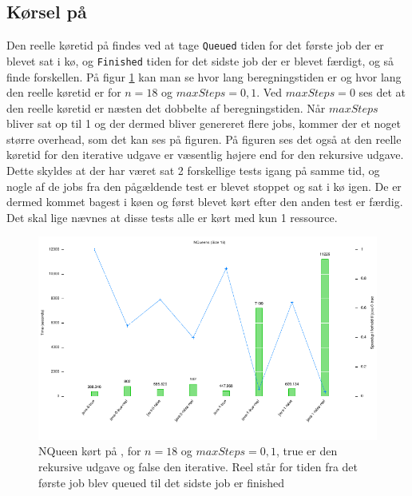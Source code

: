 \subsection{Kørsel på \mig}

Den reelle køretid på \mig findes ved at tage \texttt{Queued} tiden for det første job der er
blevet sat i kø, og \texttt{Finished} tiden for det sidste job der er blevet
færdigt, og så finde forskellen.
På figur \ref{figur:mig} kan man se hvor lang beregningstiden er og hvor lang
den reelle køretid er for $n=18$ og $maxSteps=0,1$. Ved $maxSteps=0$ ses det at
den reelle køretid er næsten det dobbelte af beregningstiden. Når $maxSteps$
bliver sat op til 1 og der dermed bliver genereret flere jobs, kommer der et
noget større overhead, som det kan ses på figuren. På figuren ses det også at
den reelle køretid for den iterative udgave er væsentlig højere end for den
rekursive udgave. Dette skyldes at der har været sat 2 forskellige tests igang
på samme tid, og nogle af de jobs fra den pågældende test er blevet stoppet og
sat i kø igen. De er dermed kommet bagest i køen og først blevet kørt efter den
anden test er færdig. Det skal lige nævnes at disse tests alle er kørt med kun 1
ressource.

\begin{figure}[h]
\begin{center}
\includegraphics{../benchmarks/mig.pdf}
\caption{NQueen kørt på \mig, for $n=18$ og $maxSteps=0,1$, true er den
rekursive udgave og false den iterative. Reel står for tiden fra det første job
blev queued til det sidste job er finished}
\label{figur:mig}
\end{center}
\end{figure}



